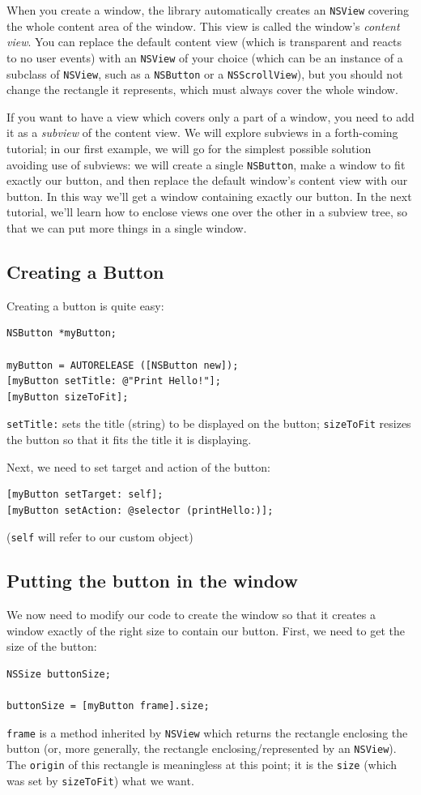 \documentclass[a4paper]{article}
\begin{document}
When you create a window, the library automatically creates an
\texttt{NSView} covering the whole content area of the window.  This
view is called the window's \emph{content view}.  You can replace the
default content view (which is transparent and reacts to no user
events) with an \texttt{NSView} of your choice (which can be an
instance of a subclass of \texttt{NSView}, such as a \texttt{NSButton}
or a \texttt{NSScrollView}), but you should not change the rectangle
it represents, which must always cover the whole window.

If you want to have a view which covers only a part of a window, you
need to add it as a \emph{subview} of the content view.  We will
explore subviews in a forth-coming tutorial; in our first example, we
will go for the simplest possible solution avoiding use of subviews:
we will create a single \texttt{NSButton}, make a window to fit
exactly our button, and then replace the default window's content view
with our button.  In this way we'll get a window containing exactly
our button.  In the next tutorial, we'll learn how to enclose views
one over the other in a subview tree, so that we can put more things
in a single window.

\subsection{Creating a Button}
Creating a button is quite easy:
\begin{verbatim}
NSButton *myButton;

myButton = AUTORELEASE ([NSButton new]);
[myButton setTitle: @"Print Hello!"];
[myButton sizeToFit];
\end{verbatim}
\texttt{setTitle:} sets the title (string) to be displayed on the button; 
\texttt{sizeToFit} resizes the button so that it fits the title it is 
displaying.

Next, we need to set target and action of the button:
\begin{verbatim}
[myButton setTarget: self];
[myButton setAction: @selector (printHello:)];
\end{verbatim}
(\texttt{self} will refer to our custom object)

\subsection{Putting the button in the window}
We now need to modify our code to create the window so that it creates
a window exactly of the right size to contain our button.  First, we
need to get the size of the button:
\begin{verbatim}
NSSize buttonSize;

buttonSize = [myButton frame].size;
\end{verbatim}
\texttt{frame} is a method inherited by \texttt{NSView} which returns
the rectangle enclosing the button (or, more generally, the rectangle
enclosing/represented by an \texttt{NSView}).  The \texttt{origin} of
this rectangle is meaningless at this point; it is the \texttt{size}
(which was set by \texttt{sizeToFit}) what we want.
\end{document}
